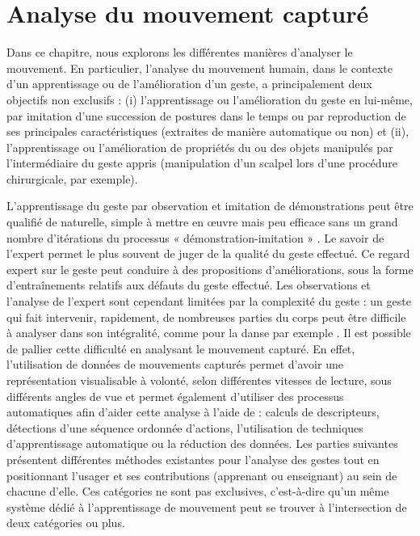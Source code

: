\chapter{Analyse du mouvement capturé}
Dans ce chapitre, nous explorons les différentes manières d'analyser le mouvement. En particulier, l'analyse du mouvement humain, dans le contexte d'un apprentissage ou de l'amélioration d'un geste, a principalement deux objectifs non exclusifs : (i) l'apprentissage ou l'amélioration du geste en lui-même, par imitation d'une succession de postures dans le temps ou par reproduction de ses principales caractéristiques (extraites de manière automatique ou non) et (ii), l'apprentissage ou l'amélioration de propriétés du ou des objets manipulés par l'intermédiaire du geste appris (manipulation d'un scalpel lors d'une procédure chirurgicale, par exemple).

L'apprentissage du geste par observation et imitation de démonstrations peut être qualifié de naturelle, simple à mettre en œuvre mais peu efficace sans un grand nombre d’itérations du processus « démonstration-imitation » \parencite{Yang2014RoP}. Le savoir de l'expert permet le plus souvent de juger de la qualité du geste effectué. Ce regard expert sur le geste peut conduire à des propositions d'améliorations, sous la forme d'entraînements relatifs aux défauts du geste effectué. Les observations et l'analyse de l'expert sont cependant limitées par la complexité du geste : un geste qui fait intervenir, rapidement, de nombreuses parties du corps peut être difficile à analyser dans son intégralité, comme pour la danse par exemple \parencite{Kyan2015ABD}. Il est possible de pallier cette difficulté en analysant le mouvement capturé. En effet, l'utilisation de données de mouvements capturés permet d'avoir une représentation visualisable à volonté, selon différentes vitesses de lecture, sous différents angles de vue \parencite{Yoshinaga2015Doa} et permet également d'utiliser des processus automatiques afin d'aider cette analyse à l'aide de : calculs de descripteurs, détections d'une séquence ordonnée d'actions, l'utilisation de techniques d'apprentissage automatique ou la réduction des données. Les parties suivantes présentent différentes méthodes existantes pour l'analyse des gestes tout en positionnant l'usager et ses contributions (apprenant ou enseignant) au sein de chacune d'elle. Ces catégories ne sont pas exclusives, c'est-à-dire qu'un même système dédié à l'apprentissage de mouvement peut se trouver à l'intersection de deux catégories ou plus.

